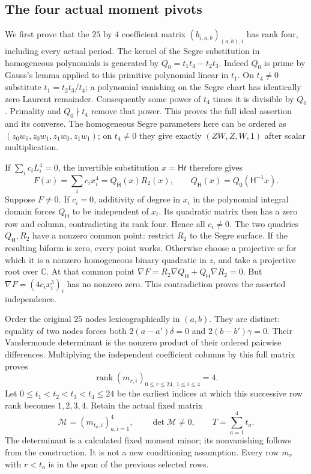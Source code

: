 \documentclass[10pt]{article}
\begin{document}
\subsection{The four actual moment pivots}

We first prove that the $25$ by $4$ coefficient matrix
$(b_{i,a,b})_{(a,b),i}$ has rank four, including every actual period.
The kernel of the Segre substitution in homogeneous polynomials is
generated by $Q_0=t_1t_4-t_2t_3$. Indeed $Q_0$ is prime by Gauss's
lemma applied to this primitive polynomial linear in $t_1$.
On $t_4\ne0$ substitute $t_1=t_2t_3/t_4$; a polynomial vanishing
on the Segre chart has identically zero Laurent remainder.
Consequently some power of $t_4$ times it is divisible by $Q_0$.
Primality and $Q_0\nmid t_4$ remove that power. This proves the
full ideal assertion and its converse. The homogeneous Segre
parameters here can be ordered as
$(z_0w_0,z_0w_1,z_1w_0,z_1w_1)$; on $t_4\ne0$ they give exactly
$(ZW,Z,W,1)$ after scalar multiplication.

If $\sum_i c_iL_i^4=0$, the invertible substitution $x=\mathsf Ht$
therefore gives
\[
 F(x)=\sum_i c_ix_i^4=Q_{\mathsf H}(x)R_2(x),\qquad
 Q_{\mathsf H}(x)=Q_0(\mathsf H^{-1}x).
\]
Suppose $F\ne0$. If $c_i=0$, additivity of degree in $x_i$ in
the polynomial integral domain forces $Q_{\mathsf H}$ to be
independent of $x_i$. Its quadratic matrix then has a zero row
and column, contradicting its rank four. Hence all $c_i\ne0$.
The two quadrics $Q_{\mathsf H},R_2$ have a nonzero common point:
restrict $R_2$ to the Segre surface. If the resulting biform is
zero, every point works. Otherwise choose a projective $w$ for
which it is a nonzero homogeneous binary quadratic in $z$,
and take a projective root over $\mathbb C$. At that common point
$\nabla F=R_2\nabla Q_{\mathsf H}+Q_{\mathsf H}\nabla R_2=0$.
But $\nabla F=(4c_ix_i^3)_i$ has no nonzero zero. This contradiction
proves the asserted independence.

Order the original 25 nodes lexicographically in $(a,b)$.
They are distinct: equality of two nodes forces both
$2(a-a')\delta=0$ and $2(b-b')\gamma=0$.
Their Vandermonde determinant is the nonzero product of their
ordered pairwise differences. Multiplying the independent
coefficient columns by this full matrix proves
\[
 \operatorname{rank}(m_{r,i})_{0\le r\le24,\ 1\le i\le4}=4 .
 \tag{PFG6}
\]
Let $0\le t_1<t_2<t_3<t_4\le24$ be the earliest indices at
which this successive row rank becomes $1,2,3,4$. Retain the
actual fixed matrix
\[
 \mathcal M=(m_{t_a,i})_{a,i=1}^4,\qquad
 \det\mathcal M\ne0,\qquad T=\sum_{a=1}^4t_a .
 \tag{PFG7}
\]
The determinant is a calculated fixed moment minor; its nonvanishing
follows from the construction. It is not a new conditioning
assumption. Every row $m_r$ with $r<t_a$ is in the span of the
previous selected rows.
\end{document}
